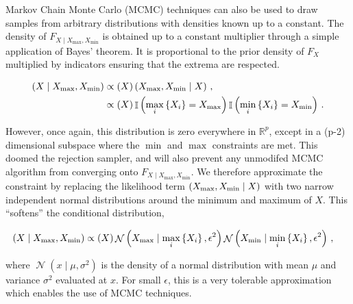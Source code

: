 \documentclass[letter]{article}
\newcommand{\genericdel}[3]{%
      \left#1#3\right#2
    }
\newcommand{\del}[1]{\genericdel(){#1}}
\newcommand{\cbr}[1]{\genericdel\{\}{#1}}
\let\Pr\relax
\DeclareMathOperator{\Pr}{\mathbb{P}}
\DeclareMathOperator{\Ind}{\mathbb{I}}
\DeclareMathOperator{\normal}{\mathcal{N}}
\newcommand{\Xmax}{X_{\max}}
\newcommand{\Xmin}{X_{\min}}
\newcommand{\Fcond}{F_{X \mid \Xmax,\Xmin}}
\newcommand{\eqlabel}[1]{\label{#1}}
\begin{document}
        Markov Chain Monte Carlo (MCMC) techniques can also be used to draw samples from arbitrary distributions with densities known up to a constant. The density of \(\Fcond\) is obtained up to a constant multiplier through a simple application of Bayes' theorem. It is proportional to the prior density of \(F_X\) multiplied by indicators ensuring that the extrema are respected.

\begin{equation}\begin{split}
    \Pr\del{X \mid \Xmax,\Xmin} &\propto \Pr\del{X} \Pr\del{\Xmax,\Xmin \mid X} \,, \\
           &\propto \Pr\del{X} \Ind\del{ \max_i\cbr{X_i} = \Xmax }\Ind\del{ \min_i\cbr{X_i} = \Xmin } \,.
\end{split}
\eqlabel{eq:bayes_exact}
\end{equation}

However, once again, this distribution is zero everywhere in \(\mathbb{R}^p\), except in a (p-2) dimensional subspace where the \(\min\) and \(\max\) constraints are met.
This doomed the rejection sampler, and will also prevent any unmodifed MCMC algorithm from converging onto \(\Fcond\).
We therefore approximate the constraint by replacing the likelihood term \(\Pr\del{\Xmax,\Xmin \mid X}\) with two narrow independent normal distributions around the minimum and maximum of \(X\).
This ``softens'' the conditional distribution,

\begin{equation}
\begin{split}
    \Pr\del{X \mid \Xmax,\Xmin} &\propto \Pr\del{X} 
                                         \normal\del{\Xmax \mid \max_i\cbr{X_i}, \epsilon^2}
                                         \normal\del{\Xmin \mid \min_i\cbr{X_i}, \epsilon^2}\,,
\end{split}
\eqlabel{eq:normal_lik}
\end{equation}

where \(\normal\del{x \mid \mu, \sigma^2}\) is the density of a normal distribution with mean \(\mu\) and variance \(\sigma^2\) evaluated at \(x\).
For small \(\epsilon\), this is a very tolerable approximation which enables the use of MCMC techniques.
    
\end{document}
